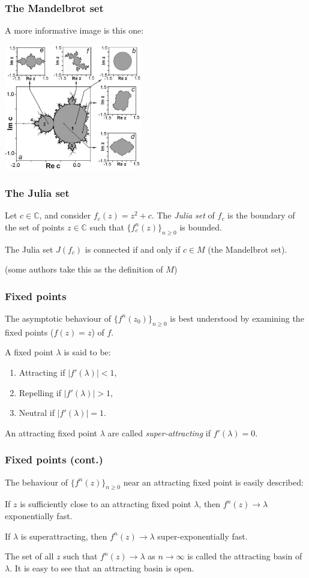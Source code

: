 \documentclass{beamer} %
\theoremstyle{definition} %
\newcommand{\Cplx}{\mathbb{C}}
\begin{document}
\begin{frame}\frametitle{The Mandelbrot set}
    A more informative image is this one:
    \begin{center}
        \includegraphics[width=60mm]{img/mandelbrot-with-captions.png}
    \end{center}
\end{frame}

\begin{frame}\frametitle{The Julia set}
    Let $c \in \Cplx$, and consider $f_c(z) = z^2+c$. The \emph{Julia set} of $f_c$ is the boundary
    of the set of points $z \in \Cplx$ such that $\{f_c^n(z)\}_{n\geq 0}$ is bounded.
    \begin{theorem}[Mandelbrot]
        The Julia set $J(f_c)$ is connected if and only if $c \in M$ (the Mandelbrot set).
    \end{theorem}
    (some authors take this as the definition of $M$)
\end{frame}

\begin{frame}\frametitle{Fixed points}
    The asymptotic behaviour of $\{f^n(z_0)\}_{n\geq 0}$ is best understood by examining the fixed points ($f(z) = z$) of $f$.
    
    A fixed point $\lambda$ is said to be:
    \begin{enumerate}
        \item{} Attracting if $|f'(\lambda)| < 1$,
        \item{} Repelling if $|f'(\lambda)| > 1$,
        \item{} Neutral if $|f'(\lambda)| = 1$.
    \end{enumerate}
    An attracting fixed point $\lambda$ are called \emph{super-attracting} if $f'(\lambda) = 0$.
\end{frame}

\begin{frame}\frametitle{Fixed points (cont.)}
    The behaviour of $\{f^n(z)\}_{n\geq 0}$ near an attracting fixed point is easily described:
    
    
    If $z$ is sufficiently close to an attracting fixed point $\lambda$, then $f^n(z)\to \lambda$ exponentially fast.
    
    If $\lambda$ is superattracting, then $f^n(z)\to \lambda$ super-exponentially fast.
        
        
    The set of all $z$ such that $f^n(z)\to  \lambda$ as $n\to\infty$ is called the attracting basin of $\lambda$.
    It is easy to see that an attracting basin is open.
\end{frame}
\end{document}
